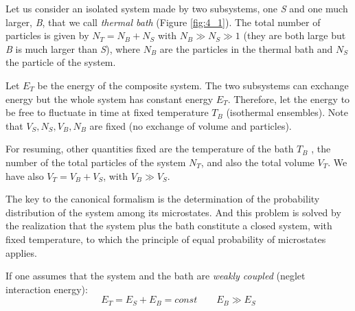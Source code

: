 \documentclass[../../Main/Main.tex]{subfiles}
\begin{document}
Let us consider an isolated system made by two subsystems, one \emph{S} and one much larger, \emph{B}, that we call \emph{thermal bath} (Figure \ref{fig:4_1}). The total number of particles is given by \( N_T = N_B + N_S\)  with \( N_B \gg N_S \gg 1 \) (they are both large but \emph{B} is much larger than \emph{S}), where \( N_B \) are the particles in the thermal bath and \( N_S \) the particle of the system.

Let \( E_T \) be the energy of the composite system. The two subsystems can exchange energy but the whole system has constant energy  \( E_T \). Therefore, let the energy to be free to fluctuate in time at fixed temperature  \( T_B \) (isothermal ensembles).
Note that \( V_S,N_S,V_B,N_B \) are fixed (no exchange of volume and particles).

For resuming, other quantities fixed are the temperature of the bath \( T_B \) , the number of the total particles of the system \( N_T \), and also the total volume \( V_T \).
 We have also \( V_T = V_B + V_S \), with   \( V_B \gg V_S \).

The key to the canonical formalism is the determination of the probability distribution of the system among its microstates. And this problem is solved by the realization that the system plus the bath constitute a closed system, with fixed temperature, to which the principle of equal probability of microstates applies.

If one assumes that the system and the bath are \emph{weakly coupled} (neglet interaction energy):
\begin{equation*}
  E_T = E_S + E_B = const \qquad E_B \gg E_S
\end{equation*}
\end{document}

